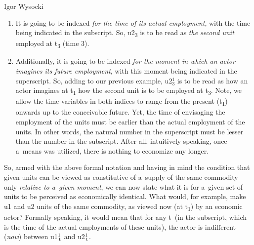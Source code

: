 \begin{artengenv}{Igor Wysocki}
\begin{enumerate}
\item It is going to be indexed \textit{for the time of its actual employment}, with the time being indicated in the subscript. So, u2\textsubscript{3} is to be read as \textit{the second unit} employed at t\textsubscript{3} (time 3).
\item Additionally, it is going to be indexed \textit{for the moment in which an actor imagines its future employment}, with this moment being indicated in the superscript. So, adding to our previous example,
u2$_{3}^{1}$ is to be read as how an actor imagines at t\textsubscript{1} how the second unit is to be employed at t\textsubscript{3}. Note, we allow the time variables in both indices to range from the present (t\textsubscript{1}) onwards up to the conceivable future. Yet, the time of envisaging the employment of the units must be earlier than the actual employment of the units. In other words, the natural number in the superscript must be lesser than the number in the subscript. After all, intuitively speaking, once a~means was utilized, there is nothing to economize any longer.
\end{enumerate}
So, armed with the above formal notation and having in mind the condition that given units can be viewed as constitutive of a~supply of the same commodity only \textit{relative to a~given moment}, we can now state what it is for a~given set of units to be perceived as economically identical. What would, for example, make u1 and u2 units of the same commodity, as viewed now (at t\textsubscript{1}) by an economic actor? Formally speaking, it would mean that for any t~(in the subscript, which is the time of the actual employments of these units), the actor is indifferent (\textit{now}) between 
u1$_{\text{\,t}}^{1}$
and
u2$_{\text{\,t}}^{1}$.

\end{artengenv}
